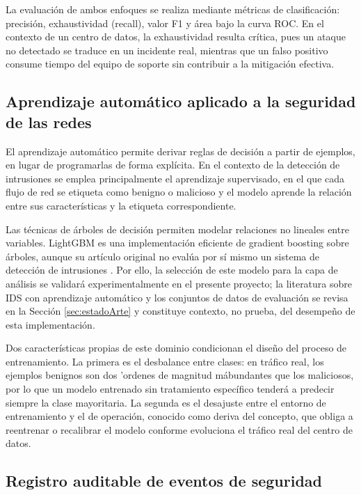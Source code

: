 La evaluaci\'on de ambos enfoques se realiza mediante m\'etricas de clasificaci\'on: precisi\'on, exhaustividad (recall), valor F1 y \'area bajo la curva ROC. En el contexto de un centro de datos, la exhaustividad resulta cr\'itica, pues un ataque no detectado se traduce en un incidente real, mientras que un falso positivo consume tiempo del equipo de soporte sin contribuir a la mitigaci\'on efectiva.

\subsection{Aprendizaje autom\'atico aplicado a la seguridad de las redes}

El aprendizaje autom\'atico permite derivar reglas de decisi\'on a partir de ejemplos, en lugar de programarlas de forma explícita. En el contexto de la detecci\'on de intrusiones se emplea principalmente el aprendizaje supervisado, en el que cada flujo de red se etiqueta como benigno o malicioso y el modelo aprende la relaci\'on entre sus caracter\'isticas y la etiqueta correspondiente.

Las t\'ecnicas de \'arboles de decisi\'on permiten modelar relaciones no lineales entre variables. LightGBM es una implementaci\'on eficiente de gradient boosting sobre \'arboles, aunque su art\'iculo original no eval\'ua por s\'i mismo un sistema de detecci\'on de intrusiones \parencite{lightgbm2017}. Por ello, la selecci\'on de este modelo para la capa de an\'alisis se validar\'a experimentalmente en el presente proyecto; la literatura sobre IDS con aprendizaje autom\'atico y los conjuntos de datos de evaluaci\'on se revisa en la Secci\'on \ref{sec:estadoArte} y constituye contexto, no prueba, del desempe\~no de esta implementaci\'on.

Dos caracter\'isticas propias de este dominio condicionan el dise\~no del proceso de entrenamiento. La primera es el desbalance entre clases: en tr\'afico real, los ejemplos benignos son dos 'ordenes de magnitud m\'abundantes que los maliciosos, por lo que un modelo entrenado sin tratamiento espec\'ifico tender\'a a predecir siempre la clase mayoritaria. La segunda es el desajuste entre el entorno de entrenamiento y el de operaci\'on, conocido como deriva del concepto, que obliga a reentrenar o recalibrar el modelo conforme evoluciona el tr\'afico real del centro de datos.

\subsection{Registro auditable de eventos de seguridad}

